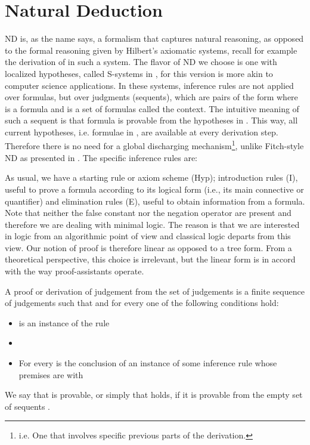 \documentclass[a4paper,UKenglish]{lipics}
\begin{document}
\section{Natural Deduction}
ND is, as the name says, a formalism that captures natural reasoning, as opposed to the formal reasoning given by Hilbert's axiomatic systems, recall for example the derivation of  in such a system.  The flavor of ND we choose is one with localized hypotheses, called S-systems in \cite{indr}, for this version is more akin to computer science applications. In these systems, inference rules are not applied over formulas, but over judgments (sequents), which are pairs of the form  where  is a formula and  is a set of formulas called the context.
The intuitive meaning of such a sequent is that formula  is provable from the hypotheses in . This way, all current hypotheses, i.e. formulae in ,  are available at every derivation step. Therefore there is no need for a global discharging mechanism\footnote{i.e. One that involves specific previous parts of the derivation.}, unlike Fitch-style ND as presented in \cite{hr,mh}. The specific inference rules are: 














As usual, we have a starting rule or axiom scheme (Hyp); introduction rules (I), useful to prove a formula according to its logical form (i.e., its main connective or quantifier) and elimination rules (E), useful to obtain information from a formula. Note that neither the false constant 
 nor the negation operator  are present and therefore we are dealing
with minimal logic. The reason is that we are interested in logic from an
algorithmic point of view and classical logic departs from this
view. Our notion of proof is therefore linear as opposed to a tree form.
From a theoretical perspective, this choice is irrelevant, but the linear
form is in accord with the way proof-assistants operate.

\begin{definition}[]\label{def:deriv}
A proof or derivation of judgement  from the
set of judgements  is a finite sequence of
judgements  such that  and for every  one of the following conditions hold:
\begin{itemize}
\item  is an instance of the  rule
\item 
\item For every  is the conclusion of an instance of some inference rule whose premises are  with 
\end{itemize}

We say that  is provable, or simply that  holds, if it is provable from the empty set of sequents .
\end{definition}
\end{document}
